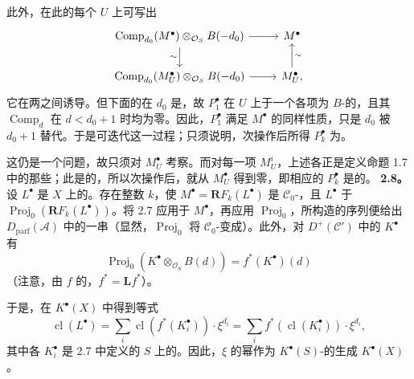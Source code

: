 此外，在此的每个 $U$ 上可写出
\[
\begin{tikzcd}
\operatorname{Comp}_{d_0}(M^\bullet)\otimes_{\mathcal O_S}B(-d_0)
\arrow[r]\arrow[d,"\sim"']&M^\bullet\\
\operatorname{Comp}_{d_0}(M_U^\bullet)\otimes_{\mathcal O_S}B(-d_0)
\arrow[r]&M_U^\bullet\arrow[u,"\sim"'],
\end{tikzcd}
\]
它在两之间诱导。但下面的在 $d_0$ 是，故 $P_1^\bullet$ 在 $U$ 上于一个各项为 $B$-的，且其 $\operatorname{Comp}_d$ 在 $d<d_0+1$ 时均为零。因此，$P_1^\bullet$ 满足 $M^\bullet$ 的同样性质，只是 $d_0$ 被 $d_0+1$ 替代。于是可迭代这一过程；只须说明，次操作后所得 $P_k^\bullet$ 为。

这仍是一个问题，故只须对 $M_U^\bullet$ 考察。而对每一项 $M_U^i$，上述各正是定义命题 1.7 中的那些；此是的，所以次操作后，就从 $M_U^\bullet$ 得到零，即相应的 $P_k^\bullet$ 是的。
\textbf{2.8。} 设 $L^\bullet$ 是 $X$ 上的。存在整数 $k$，使 $M^\bullet=\mathbf RF_k(L^\bullet)$ 是 $\mathscr C_0$-，且 $L^\bullet$ 于 $\operatorname{Proj}_0(\mathbf RF_k(L^\bullet))$。将 2.7 应用于 $M^\bullet$，再应用 $\operatorname{Proj}_0$，所构造的序列便给出 $D_{\mathrm{parf}}(\mathscr A)$ 中的一串（显然，$\operatorname{Proj}_0$ 将 $\mathscr C_0$-变成）。此外，对 $D^+(\mathscr C')$ 中的 $K^\bullet$ 有
\[
\operatorname{Proj}_0(K^\bullet\otimes_{\mathcal O_S}B(d))=f^*(K^\bullet)(d)
\]
（注意，由 $f$ 的，$f^*=\mathbf Lf^*$）。

于是，在 $K^\bullet(X)$ 中得到等式
\[
\operatorname{cl}(L^\bullet)
=\sum_i\operatorname{cl}(f^*(K_i^\bullet))\cdot\xi^{d_i}
=\sum_i f^*(\operatorname{cl}(K_i^\bullet))\cdot\xi^{d_i},
\]
其中各 $K_i^\bullet$ 是 2.7 中定义的 $S$ 上的。因此，$\xi$ 的幂作为 $K^\bullet(S)$-的生成 $K^\bullet(X)$。

